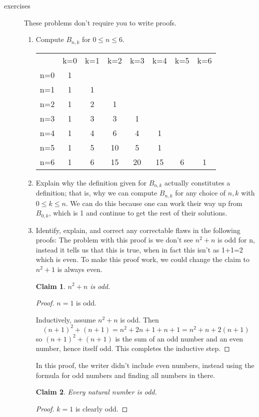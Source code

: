 \documentclass[11pt]{letter}
\newtheorem{claim}{Claim}
\theoremstyle{definition}
\begin{document}
\begin{description}
	\item[exercises]  These problems don't require you to write proofs.
		\begin{enumerate}
			\item Compute $B_{n,k}$ for $0\leq n\leq 6$. \\
                        \begin{tabular}{||c|c|c|c|c|c|c|c||}
                          \hline
                        ${}$&k=0&k=1&k=2&k=3&k=4&k=5&k=6 \\
                          n=0 &1 \\
                          n=1&1&1 \\
                          n=2&1&2&1\\
                          n=3&1&3&3&1\\
                          n=4&1&4&6&4&1\\
                          n=5&1&5&10&5&1\\
                          n=6&1&6&15&20&15&6&1\\

                            
                          \hline
                          \end{tabular}  
                          
			\item Explain why the definition given for $B_{n,k}$ actually constitutes a definition; that is, why we can compute $B_{n,k}$ for any choice of $n,k$ with $0\leq k\leq n$. We can do this because one can work their way up from $B_{0,k}$, which is 1 and continue to get the rest of their solutions.
			\item Identify, explain, and correct any correctable flaws in the following proofs:
                          The problem with this proof is we don't see $n^2+n$ is odd for n, instead it tells us that this is true, when in fact this isn't as 1+1=2 which is even. To make this proof work, we could change the claim to $n^2+1$ is always even.
				\begin{claim}
					$n^2+n$ is odd.
				\end{claim}
				\begin{proof}
					$n=1$ is odd.
					
					Inductively, assume $n^2+n$ is odd. Then
					$$(n+1)^2+(n+1)=n^2+2n+1+n+1=n^2+n+2(n+1)$$
					so $(n+1)^2+(n+1)$ is the sum of an odd number and an even number, hence itself odd. This completes the inductive step.
				\end{proof}
				In this proof, the writer didn't include even numbers, instead using the formula for odd numbers and finding all numbers in there.
				\begin{claim}
					Every natural number is odd.
				\end{claim}
				\begin{proof}
					$k=1$ is clearly odd.
					

\end{proof}
\end{enumerate}
\end{description}
\end{document}
